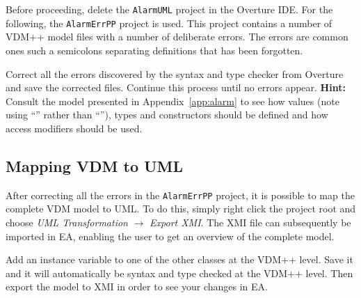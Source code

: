 %

Before proceeding, delete the \texttt{AlarmUML} project in the Overture IDE.
For the following, the \texttt{AlarmErrPP} project is used. This project contains 
a number of VDM++ model files with a number of
deliberate errors.  The errors are common ones such a
semicolons separating definitions that has been forgotten.

\begin{myhardexercise}\label{ex:type-errors}
Correct all the errors discovered by the syntax and type checker from
Overture and save the corrected files. Continue this process until no errors appear.
\textbf{Hint:} Consult the model presented in 
Appendix~\ref{app:alarm}
to see how values (note using ``\vdmstyle{=}'' rather than
``\vdmstyle{:=}''), types and constructors should be defined and how
access modifiers should be used.
\end{myhardexercise}


\subsection{Mapping VDM to UML}

After correcting all the errors in the \texttt{AlarmErrPP} project, it is possible
to map the complete VDM model to UML. To do this, simply right
click the project root and choose \emph{UML Transformation} $
\rightarrow $ \emph{Export XMI}. The XMI file can subsequently be
imported in EA, enabling the user to get an overview
of the complete model.

\begin{myexercise}\label{ex:rosemapping}
Add an instance variable to one of the other classes at the VDM++
level. Save it and it will automatically be syntax and type checked at
the VDM++ level. Then export the model to XMI in order to see your
changes in EA.
\end{myexercise}




